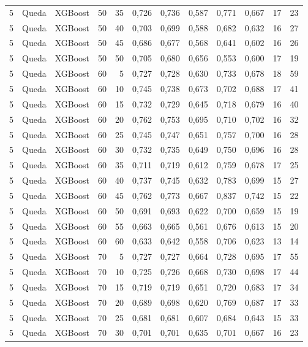 \begin{longtable}{@{}rllrrrrrrrrr@{}}
5 & Queda & XGBoost & 50 & 35 & 0,726 & 0,736 & 0,587 & 0,771 & 0,667 & 17 & 23 \\
5 & Queda & XGBoost & 50 & 40 & 0,703 & 0,699 & 0,588 & 0,682 & 0,632 & 16 & 27 \\
5 & Queda & XGBoost & 50 & 45 & 0,686 & 0,677 & 0,568 & 0,641 & 0,602 & 16 & 26 \\
5 & Queda & XGBoost & 50 & 50 & 0,705 & 0,680 & 0,656 & 0,553 & 0,600 & 17 & 19 \\
5 & Queda & XGBoost & 60 & 5 & 0,727 & 0,728 & 0,630 & 0,733 & 0,678 & 18 & 59 \\
5 & Queda & XGBoost & 60 & 10 & 0,745 & 0,738 & 0,673 & 0,702 & 0,688 & 17 & 41 \\
5 & Queda & XGBoost & 60 & 15 & 0,732 & 0,729 & 0,645 & 0,718 & 0,679 & 16 & 40 \\
5 & Queda & XGBoost & 60 & 20 & 0,762 & 0,753 & 0,695 & 0,710 & 0,702 & 16 & 32 \\
5 & Queda & XGBoost & 60 & 25 & 0,745 & 0,747 & 0,651 & 0,757 & 0,700 & 16 & 28 \\
5 & Queda & XGBoost & 60 & 30 & 0,732 & 0,735 & 0,649 & 0,750 & 0,696 & 16 & 28 \\
5 & Queda & XGBoost & 60 & 35 & 0,711 & 0,719 & 0,612 & 0,759 & 0,678 & 17 & 25 \\
5 & Queda & XGBoost & 60 & 40 & 0,737 & 0,745 & 0,632 & 0,783 & 0,699 & 15 & 27 \\
5 & Queda & XGBoost & 60 & 45 & 0,762 & 0,773 & 0,667 & 0,837 & 0,742 & 15 & 22 \\
5 & Queda & XGBoost & 60 & 50 & 0,691 & 0,693 & 0,622 & 0,700 & 0,659 & 15 & 19 \\
5 & Queda & XGBoost & 60 & 55 & 0,663 & 0,665 & 0,561 & 0,676 & 0,613 & 15 & 20 \\
5 & Queda & XGBoost & 60 & 60 & 0,633 & 0,642 & 0,558 & 0,706 & 0,623 & 13 & 14 \\
5 & Queda & XGBoost & 70 & 5 & 0,727 & 0,727 & 0,664 & 0,728 & 0,695 & 17 & 55 \\
5 & Queda & XGBoost & 70 & 10 & 0,725 & 0,726 & 0,668 & 0,730 & 0,698 & 17 & 44 \\
5 & Queda & XGBoost & 70 & 15 & 0,719 & 0,719 & 0,651 & 0,720 & 0,683 & 17 & 34 \\
5 & Queda & XGBoost & 70 & 20 & 0,689 & 0,698 & 0,620 & 0,769 & 0,687 & 17 & 33 \\
5 & Queda & XGBoost & 70 & 25 & 0,681 & 0,681 & 0,607 & 0,684 & 0,643 & 15 & 33 \\
5 & Queda & XGBoost & 70 & 30 & 0,701 & 0,701 & 0,635 & 0,701 & 0,667 & 16 & 23 \\

\end{longtable}
